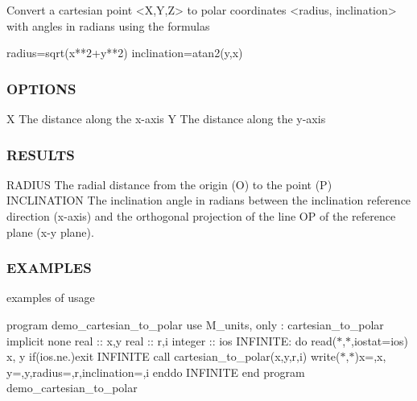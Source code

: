 \begin{DoxyVerb} Convert a cartesian point <X,Y,Z> to polar coordinates <radius,
 inclination> with angles in radians using the formulas

   radius=sqrt(x**2+y**2)
   inclination=atan2(y,x)
\end{DoxyVerb}


\subsubsection*{O\+P\+T\+I\+O\+NS}

X The distance along the x-\/axis Y The distance along the y-\/axis

\subsubsection*{R\+E\+S\+U\+L\+TS}

\begin{DoxyVerb}RADIUS       The radial distance from the origin (O) to the point (P)
INCLINATION  The inclination angle in radians between the inclination reference direction
             (x-axis) and the orthogonal projection of the line OP of the
             reference plane (x-y plane).
\end{DoxyVerb}


\subsubsection*{E\+X\+A\+M\+P\+L\+ES}

examples of usage

program demo\+\_\+cartesian\+\_\+to\+\_\+polar use M\+\_\+units, only \+: cartesian\+\_\+to\+\_\+polar implicit none real \+:\+: x,y real \+:\+: r,i integer \+:\+: ios I\+N\+F\+I\+N\+I\+TE\+: do read($\ast$,$\ast$,iostat=ios) x, y if(ios.\+ne.)exit I\+N\+F\+I\+N\+I\+TE call cartesian\+\_\+to\+\_\+polar(x,y,r,i) write($\ast$,$\ast$)\textquotesingle{}x=\textquotesingle{},x,\textquotesingle{} y=\textquotesingle{},y,\textquotesingle{}radius=\textquotesingle{},r,\textquotesingle{}inclination=\textquotesingle{},i enddo I\+N\+F\+I\+N\+I\+TE end program demo\+\_\+cartesian\+\_\+to\+\_\+polar \mbox{\label{namespacem__units_a3a1fe55d63ec4ac38f3d00005f9ebac5}} 
